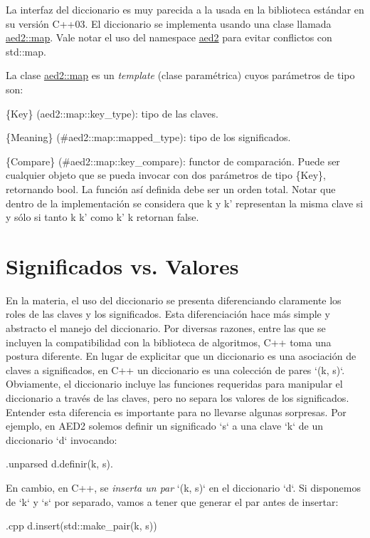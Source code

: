\-La interfaz del diccionario es muy parecida a la usada en la biblioteca estándar en su versión \-C++03. \-El diccionario se implementa usando una clase llamada \hyperlink{classaed2_1_1map}{aed2\-::map}. \-Vale notar el uso del namespace \hyperlink{namespaceaed2}{aed2} para evitar conflictos con std\-::map.

\-La clase \hyperlink{classaed2_1_1map}{aed2\-::map} es un {\itshape template\/} (clase paramétrica) cuyos parámetros de tipo son\-:
\begin{DoxyItemize}
\item \{\-Key\} (aed2\-::map\-::key\-\_\-type)\-: tipo de las claves.
\item \{\-Meaning\} (\#aed2\-::map\-::mapped\-\_\-type)\-: tipo de los significados.
\item \{\-Compare\} (\#aed2\-::map\-::key\-\_\-compare)\-: functor de comparación. \-Puede ser cualquier objeto que se pueda invocar con dos parámetros de tipo \{\-Key\}, retornando {\ttfamily bool}. \-La función  así definida debe ser un orden total. \-Notar que dentro de la implementación se considera que {\ttfamily k} y {\ttfamily k'} representan la misma clave si y sólo si tanto {\ttfamily k}  {\ttfamily k'} como {\ttfamily k'}  {\ttfamily k} retornan {\ttfamily false}.
\end{DoxyItemize}\hypertarget{Interfaz_Diferencias}{}\section{\-Significados vs. Valores}\label{Interfaz_Diferencias}
\-En la materia, el uso del diccionario se presenta diferenciando claramente los roles de las claves y los significados. \-Esta diferenciación hace más simple y abstracto el manejo del diccionario. \-Por diversas razones, entre las que se incluyen la compatibilidad con la biblioteca de algoritmos, \-C++ toma una postura diferente. \-En lugar de explicitar que un diccionario es una asociación de claves a significados, en \-C++ un diccionario es una colección de pares `(k, s)`. \-Obviamente, el diccionario incluye las funciones requeridas para manipular el diccionario a través de las claves, pero no separa los valores de los significados. \-Entender esta diferencia es importante para no llevarse algunas sorpresas. \-Por ejemplo, en \-A\-E\-D2 solemos definir un significado `s` a una clave `k` de un diccionario `d` invocando\-: 
\begin{DoxyCode}
 {.unparsed}
 d.definir(k, s).
\end{DoxyCode}
 \-En cambio, en \-C++, se {\itshape inserta un par\/} `(k, s)` en el diccionario `d`. \-Si disponemos de `k` y `s` por separado, vamos a tener que generar el par antes de insertar\-: 
\begin{DoxyCode}
 {.cpp}
 d.insert(std::make_pair(k, s))
\end{DoxyCode}


